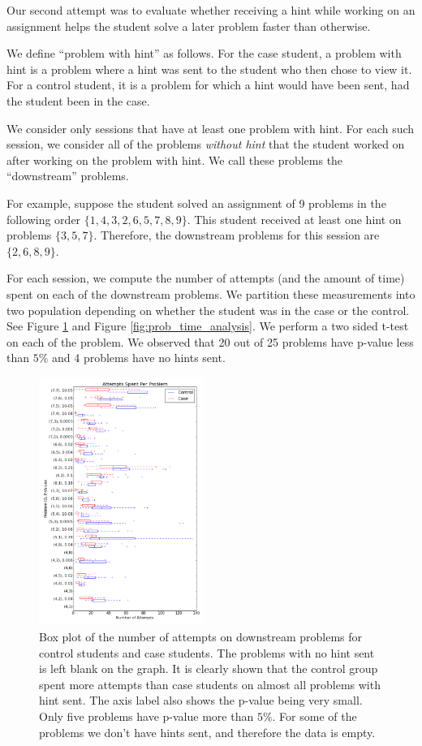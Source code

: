 \documentclass{sigchi}
\begin{document}
Our second attempt was to evaluate whether receiving a hint while working on an assignment helps the student solve a later problem faster than otherwise.

We define ``problem with hint'' as follows. For the case student, a
problem with hint is a problem where a hint was sent to the student who then chose to view it. For a control student, it is a problem for which a hint would have been sent, had the student been in the case.

We consider only sessions that have at least one problem with
hint. For each such session, we consider all of the problems {\em
  without hint} that the student worked on after working on the
problem with hint. We call these problems the ``downstream'' problems.

For example, suppose the student solved an assignment of 9 problems in the following order $\{ 1, 4, 3, 2, 6, 5, 7, 8, 9\}$. This student received at least one hint on problems $\{3, 5, 7\}$. Therefore, the downstream problems for this session are $\{2, 6, 8, 9\}$.

For each session, we compute the number of attempts (and the amount of time) spent on each of the downstream problems. We partition these measurements into two population depending on whether the student was in the case or the control. See Figure \ref{fig:prob_tries_analysis} and Figure \ref{fig:prob_time_analysis}. We perform a two sided t-test on each of the problem. We observed that 20 out of 25 problems have p-value less than $5\%$ and 4 problems have no hints sent.

\begin{figure}[ht]
  \centering
  \includegraphics[width=0.48\textwidth]{image/problem_tries_downstream.png}
  \caption{Box plot of the number of attempts on downstream problems for control students and case students. The problems with no hint sent is left blank on the graph. It is clearly shown that the control group spent more attempts than case students on almost all problems with hint sent. The axis label also shows the p-value being very small. Only five problems have p-value more than $5\%$. For some of the problems we don't have hints sent, and therefore the data is empty.}
   \label{fig:prob_tries_analysis}
\end{figure}
\end{document}
